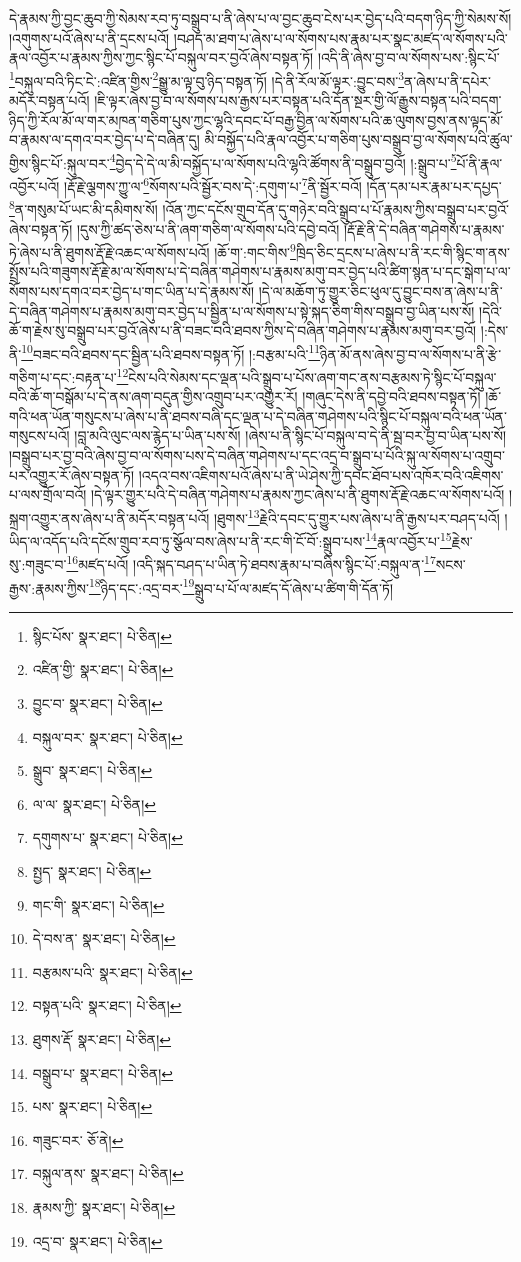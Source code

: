 དེ་རྣམས་ཀྱི་བྱང་ཆུབ་ཀྱི་སེམས་རབ་ཏུ་བསྒྲུབ་པ་ནི་ཞེས་པ་ལ་བྱང་ཆུབ་ངེས་པར་བྱེད་པའི་བདག་ཉིད་ཀྱི་སེམས་སོ། །འགུགས་པའོ་ཞེས་པ་ནི་དྲངས་པའོ། །བཤད་མ་ཐག་པ་ཞེས་པ་ལ་སོགས་པས་རྣམ་པར་སྣང་མཛད་ལ་སོགས་པའི་རྣལ་འབྱོར་པ་རྣམས་ཀྱིས་ཀྱང་སྙིང་པོ་བསྐུལ་བར་བྱའོ་ཞེས་བསྟན་ཏོ། །འདི་ནི་ཞེས་བྱ་བ་ལ་སོགས་པས་:སྙིང་པོ་\footnote{སྙིང་པོས་  སྣར་ཐང་།  པེ་ཅིན། }བསྐུལ་བའི་ཏིང་ངེ་:འཛིན་གྱིས་\footnote{འཛིན་གྱི་  སྣར་ཐང་།  པེ་ཅིན། }སྒྱུ་མ་ལྟ་བུ་ཉིད་བསྟན་ཏོ། །དེ་ནི་རོལ་མོ་ལྟར་:བྱུང་བས་\footnote{བྱུང་བ་  སྣར་ཐང་།  པེ་ཅིན། }ན་ཞེས་པ་ནི་དཔེར་མདོར་བསྟན་པའོ། །ཇི་ལྟར་ཞེས་བྱ་བ་ལ་སོགས་པས་རྒྱས་པར་བསྟན་པའི་དོན་སྔར་གྱི་ལོ་རྒྱུས་བསྟན་པའི་བདག་ཉིད་ཀྱི་རོལ་མོ་ལ་གར་མཁན་གཅིག་པུས་ཀྱང་ལྷའི་དབང་པོ་བརྒྱ་བྱིན་ལ་སོགས་པའི་ཆ་ལུགས་བྱས་ནས་ལྟད་མོ་བ་རྣམས་ལ་དགའ་བར་བྱེད་པ་དེ་བཞིན་དུ། མི་བསྐྱོད་པའི་རྣལ་འབྱོར་པ་གཅིག་པུས་བསྒྲུབ་བྱ་ལ་སོགས་པའི་ཚུལ་གྱིས་སྙིང་པོ་:སྐུལ་བར་\footnote{བསྐུལ་བར་  སྣར་ཐང་།  པེ་ཅིན། }བྱེད་དེ་དེ་ལ་མི་བསྐྱོད་པ་ལ་སོགས་པའི་ལྷའི་ཚོགས་ནི་བསྒྲུབ་བྱའོ། །:སྒྲུབ་པ་\footnote{སྒྲུབ་  སྣར་ཐང་།  པེ་ཅིན། }པོ་ནི་རྣལ་འབྱོར་པའོ། །རྡོ་རྗེ་ལྕགས་ཀྱུ་ལ་\footnote{ལ་ལ་  སྣར་ཐང་།  པེ་ཅིན། }སོགས་པའི་སྦྱོར་བས་དེ་:དགུག་པ་\footnote{དགུགས་པ་  སྣར་ཐང་།  པེ་ཅིན། }ནི་སྦྱོར་བའོ། །དོན་དམ་པར་རྣམ་པར་དཔྱད་\footnote{སྤྱད་  སྣར་ཐང་།  པེ་ཅིན། }ན་གསུམ་པོ་ཡང་མི་དམིགས་སོ། །འོན་ཀྱང་དངོས་གྲུབ་དོན་དུ་གཉེར་བའི་སྒྲུབ་པ་པོ་རྣམས་ཀྱིས་བསྒྲུབ་པར་བྱའོ་ཞེས་བསྟན་ཏོ། །དུས་ཀྱི་ཚད་ཅེས་པ་ནི་ཞག་གཅིག་ལ་སོགས་པའི་དབྱེ་བའོ། །རྡོ་རྗེ་ནི་དེ་བཞིན་གཤེགས་པ་རྣམས་ཏེ་ཞེས་པ་ནི་ཐུགས་རྡོ་རྗེ་འཆང་ལ་སོགས་པའོ། །ཆོ་ག་:གང་གིས་\footnote{གང་གི་  སྣར་ཐང་།  པེ་ཅིན། }ཁྲིད་ཅིང་དྲངས་པ་ཞེས་པ་ནི་རང་གི་སྙིང་ག་ནས་སྤྲོས་པའི་གཟུགས་རྡོ་རྗེ་མ་ལ་སོགས་པ་དེ་བཞིན་གཤེགས་པ་རྣམས་མགུ་བར་བྱེད་པའི་ཚིག་སྙན་པ་དང་སྒེག་པ་ལ་སོགས་པས་དགའ་བར་བྱེད་པ་གང་ཡིན་པ་དེ་རྣམས་སོ། །དེ་ལ་མཆོག་ཏུ་གྱུར་ཅིང་ཕུལ་དུ་བྱུང་བས་ན་ཞེས་པ་ནི་དེ་བཞིན་གཤེགས་པ་རྣམས་མགུ་བར་བྱེད་པ་སྦྱིན་པ་ལ་སོགས་པ་སྟེ་སྐད་ཅིག་གིས་བསྒྲུབ་བྱ་ཡིན་པས་སོ། །དེའི་ཆོ་ག་རྗེས་སུ་བསྒྲུབ་པར་བྱའོ་ཞེས་པ་ནི་བཟང་བའི་ཐབས་ཀྱིས་དེ་བཞིན་གཤེགས་པ་རྣམས་མགུ་བར་བྱའོ། །:དེས་ནི་\footnote{དེ་བས་ན་  སྣར་ཐང་།  པེ་ཅིན། }བཟང་བའི་ཐབས་དང་སྦྱིན་པའི་ཐབས་བསྟན་ཏོ། །:བརྩམ་པའི་\footnote{བརྩམས་པའི་  སྣར་ཐང་།  པེ་ཅིན། }ཉིན་མོ་ནས་ཞེས་བྱ་བ་ལ་སོགས་པ་ནི་རྩེ་གཅིག་པ་དང་:བརྟན་པ་\footnote{བསྟན་པའི་  སྣར་ཐང་།  པེ་ཅིན། }ངེས་པའི་སེམས་དང་ལྡན་པའི་སྒྲུབ་པ་པོས་ཞག་གང་ནས་བརྩམས་ཏེ་སྙིང་པོ་བསྐུལ་བའི་ཆོ་ག་བསྒོམ་པ་དེ་ནས་ཞག་བདུན་གྱིས་འགྲུབ་པར་འགྱུར་རོ། །གཞུང་དེས་ནི་དབྱེ་བའི་ཐབས་བསྟན་ཏོ། །ཆོ་གའི་ཕན་ཡོན་གསུངས་པ་ཞེས་པ་ནི་ཐབས་བཞི་དང་ལྡན་པ་དེ་བཞིན་གཤེགས་པའི་སྙིང་པོ་བསྐུལ་བའི་ཕན་ཡོན་གསུངས་པའོ། །བླ་མའི་ལུང་ལས་རྙེད་པ་ཡིན་པས་སོ། །ཞེས་པ་ནི་སྙིང་པོ་བསྐུལ་བ་དེ་ནི་སྦ་བར་བྱ་བ་ཡིན་པས་སོ། །བསྒྲུབ་པར་བྱ་བའི་ཞེས་བྱ་བ་ལ་སོགས་པས་དེ་བཞིན་གཤེགས་པ་དང་འདྲ་བ་སྒྲུབ་པ་པོའི་སྐུ་ལ་སོགས་པ་འགྲུབ་པར་འགྱུར་རོ་ཞེས་བསྟན་ཏོ། །འདའ་བས་འཇིགས་པའོ་ཞེས་པ་ནི་ཡེ་ཤེས་ཀྱི་དབང་ཐོབ་པས་འཁོར་བའི་འཇིགས་པ་ལས་གྲོལ་བའོ། །དེ་ལྟར་གྱུར་པའི་དེ་བཞིན་གཤེགས་པ་རྣམས་ཀྱང་ཞེས་པ་ནི་ཐུགས་རྡོ་རྗེ་འཆང་ལ་སོགས་པའོ། །སྐྲག་འགྱུར་ནས་ཞེས་པ་ནི་མདོར་བསྟན་པའོ། །ཐུགས་\footnote{ཐུགས་རྡོ་  སྣར་ཐང་།  པེ་ཅིན། }རྗེའི་དབང་དུ་གྱུར་པས་ཞེས་པ་ནི་རྒྱས་པར་བཤད་པའོ། །ཡིད་ལ་འདོད་པའི་དངོས་གྲུབ་རབ་ཏུ་སྩོལ་བས་ཞེས་པ་ནི་རང་གི་ངོ་བོ་:སྒྲུབ་པས་\footnote{བསྒྲུབ་པ་  སྣར་ཐང་།  པེ་ཅིན། }རྣལ་འབྱོར་པ་\footnote{པས་  སྣར་ཐང་།  པེ་ཅིན། }རྗེས་སུ་:གཟུང་བ་\footnote{གཟུང་བར་  ཅོ་ནེ། }མཛད་པའོ། །འདི་སྐད་བཤད་པ་ཡིན་ཏེ་ཐབས་རྣམ་པ་བཞིས་སྙིང་པོ་:བསྐུལ་ན་\footnote{བསྐུལ་ནས་  སྣར་ཐང་།  པེ་ཅིན། }སངས་རྒྱས་:རྣམས་ཀྱིས་\footnote{རྣམས་ཀྱི་  སྣར་ཐང་།  པེ་ཅིན། }ཉིད་དང་:འདྲ་བར་\footnote{འདྲ་བ་  སྣར་ཐང་།  པེ་ཅིན། }སྒྲུབ་པ་པོ་ལ་མཛད་དོ་ཞེས་པ་ཚིག་གི་དོན་ཏོ། 